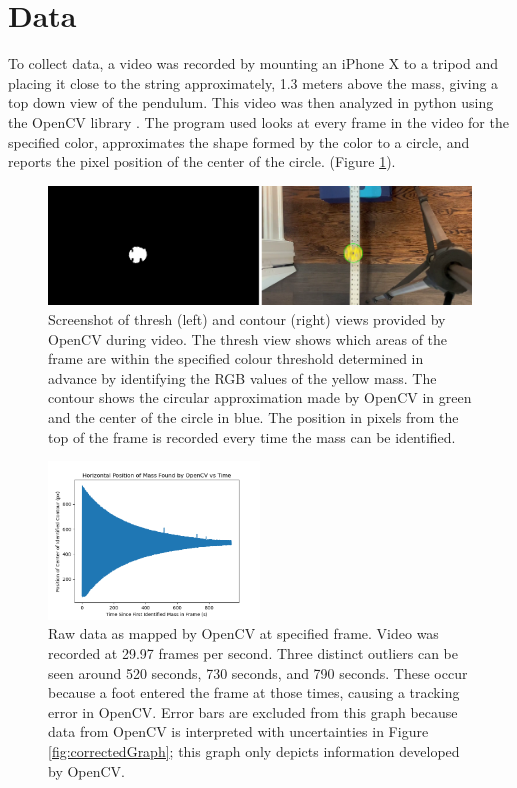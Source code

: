 \documentclass[11pt]{article}
\begin{document}
    
    \section{Data}
        To collect data, a video was recorded by mounting an iPhone X to a tripod and placing it close to the string approximately, 1.3 meters above the mass, giving a top down view of the pendulum. This video was then analyzed in python using the OpenCV library \cite{opencv_library}. The program used looks at every frame in the video for the specified color, approximates the shape formed by the color to a circle, and reports the pixel position of the center of the circle. (Figure \ref{fig:opencvView}).

        \begin{figure}[H]
            \centering\includegraphics[width = 1\textwidth]{combo.PNG}
            \caption{Screenshot of thresh (left) and contour (right) views provided by OpenCV during video. The thresh view shows which areas of the frame are within the specified colour threshold determined in advance by identifying the RGB values of the yellow mass. The contour shows the circular approximation made by OpenCV in green and the center of the circle in blue. The position in pixels from the top of the frame is recorded every time the mass can be identified.}
            \label{fig:opencvView}
        \end{figure}


        \begin{figure}[H]
            \centering\includegraphics[width = 0.5\textwidth]{rawData.png}
            \caption{Raw data as mapped by OpenCV at specified frame. Video was recorded at 29.97 frames per second. Three distinct outliers can be seen around 520 seconds, 730 seconds, and 790 seconds. These occur because a foot entered the frame at those times, causing a tracking error in OpenCV. Error bars are excluded from this graph because data from OpenCV is interpreted with uncertainties in Figure \ref{fig:correctedGraph}; this graph only depicts information developed by OpenCV.}
            \label{fig:rawData}
        \end{figure}
\end{document}
